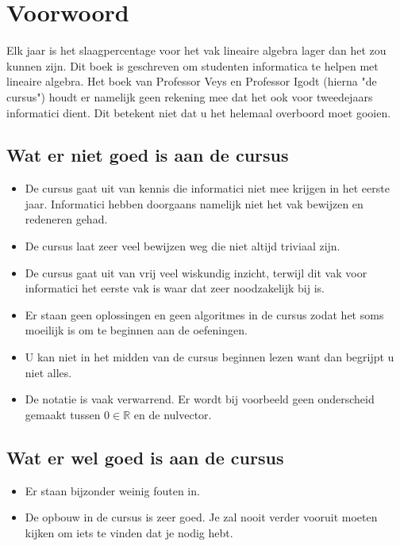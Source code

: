 \documentclass[lineaire_algebra_oplossingen.tex]{subfiles}
\begin{document}
\newpage
\section*{Voorwoord}
Elk jaar is het slaagpercentage voor het vak lineaire algebra lager dan het zou kunnen zijn. Dit boek is geschreven om studenten informatica te helpen met lineaire algebra. Het boek van Professor Veys en Professor Igodt (hierna "de cursus") houdt er namelijk geen rekening mee dat het ook voor tweedejaars informatici dient. Dit betekent niet dat u het helemaal overboord moet gooien.

\subsection*{Wat er niet goed is aan de cursus}
\begin{itemize}
\item De cursus gaat uit van kennis die informatici niet mee krijgen in het eerste jaar. Informatici hebben doorgaans namelijk niet het vak bewijzen en redeneren gehad.
\item De cursus laat zeer veel bewijzen weg die niet altijd triviaal zijn.
\item De cursus gaat uit van vrij veel wiskundig inzicht, terwijl dit vak voor informatici het eerste vak is waar dat zeer noodzakelijk bij is.
\item Er staan geen oplossingen en geen algoritmes in de cursus zodat het soms moeilijk is om te beginnen aan de oefeningen.
\item U kan niet in het midden van de cursus beginnen lezen want dan begrijpt u niet alles.
\item De notatie is vaak verwarrend. Er wordt bij voorbeeld geen onderscheid gemaakt tussen $0\in \mathbb{R}$ en de nulvector.
\end{itemize}
\subsection*{Wat er wel goed is aan de cursus}
\begin{itemize}
\item Er staan bijzonder weinig fouten in.
\item De opbouw in de cursus is zeer goed. Je zal nooit verder vooruit moeten kijken om iets te vinden dat je nodig hebt.
\end{itemize}
\end{document}
